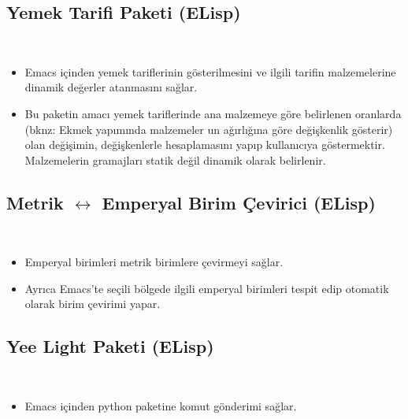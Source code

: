 {	\subsection{Yemek Tarifi Paketi (ELisp)} \label{lisp:frp} \hfill \\
	\begin{itemize}
	\item Emacs içinden yemek tariflerinin gösterilmesini ve ilgili tarifin
	malzemelerine dinamik değerler atanmasını sağlar.
	\item Bu paketin amacı yemek tariflerinde ana malzemeye göre belirlenen
	oranlarda (bknz: Ekmek yapımında malzemeler un ağırlığına göre değişkenlik
	gösterir) olan değişimin, değişkenlerle hesaplamasını yapıp kullanıcıya
	göstermektir. Malzemelerin gramajları statik değil dinamik olarak belirlenir.
	\end{itemize}

	\subsection{Metrik $\longleftrightarrow$ Emperyal Birim Çevirici (ELisp)}
	\hfill \\
	\begin{itemize}
	\item Emperyal birimleri metrik birimlere çevirmeyi sağlar.
	\item Ayrıca Emacs'te seçili bölgede ilgili emperyal birimleri tespit edip
	otomatik olarak birim çevirimi yapar.
	\end{itemize}


	\subsection{Yee Light Paketi (ELisp)} \hfill \\
	\begin{itemize}
	\item Emacs içinden  python paketine komut gönderimi sağlar.
	\end{itemize}

}
